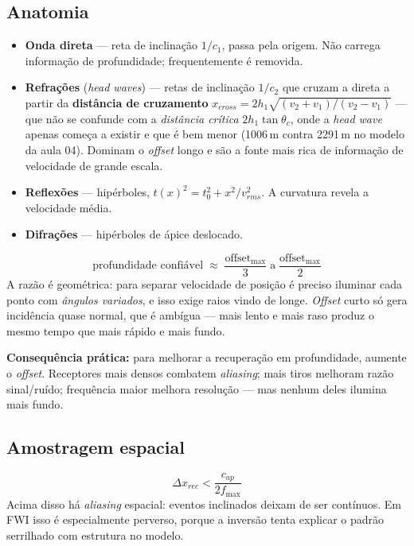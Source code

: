 \documentclass[11pt,a4paper,oneside]{report}
\begin{document}
\subsection*{Anatomia}
\begin{itemize}[leftmargin=*]
\item \textbf{Onda direta} --- reta de inclinação $1/c_1$, passa pela origem.
Não carrega informação de profundidade; frequentemente é removida.
\item \textbf{Refrações} (\emph{head waves}) --- retas de inclinação $1/c_2$
que cruzam a direta a partir da \textbf{distância de cruzamento}
$x_{cross} = 2h_1\sqrt{(v_2{+}v_1)/(v_2{-}v_1)}$ --- que não se confunde com a
\emph{distância crítica} $2h_1\tan\theta_c$, onde a \emph{head wave} apenas
começa a existir e que é bem menor (1006\,m contra 2291\,m no modelo da
aula 04). Dominam o
\emph{offset} longo e são a fonte mais rica de informação de velocidade de
grande escala.
\item \textbf{Reflexões} --- hipérboles, $t(x)^2 = t_0^2 + x^2/v_{rms}^2$.
A curvatura revela a velocidade média.
\item \textbf{Difrações} --- hipérboles de ápice deslocado.
\end{itemize}

\begin{teoria}
\[
\text{profundidade confiável} \;\approx\; \frac{\text{offset}_{\max}}{3}
\;\text{a}\; \frac{\text{offset}_{\max}}{2}
\]
A razão é geométrica: para separar velocidade de posição é preciso iluminar
cada ponto com \emph{ângulos variados}, e isso exige raios vindo de longe.
\emph{Offset} curto só gera incidência quase normal, que é ambígua --- mais
lento e mais raso produz o mesmo tempo que mais rápido e mais fundo.

\textbf{Consequência prática:} para melhorar a recuperação em profundidade,
aumente o \emph{offset}. Receptores mais densos combatem \emph{aliasing};
mais tiros melhoram razão sinal/ruído; frequência maior melhora resolução ---
mas nenhum deles ilumina mais fundo.
\end{teoria}

\subsection*{Amostragem espacial}
\begin{equation}
\Delta x_{rec} < \frac{c_{ap}}{2 f_{\max}}
\end{equation}
Acima disso há \emph{aliasing} espacial: eventos inclinados deixam de ser
contínuos. Em FWI isso é especialmente perverso, porque a inversão tenta
explicar o padrão serrilhado com estrutura no modelo.
\end{document}
